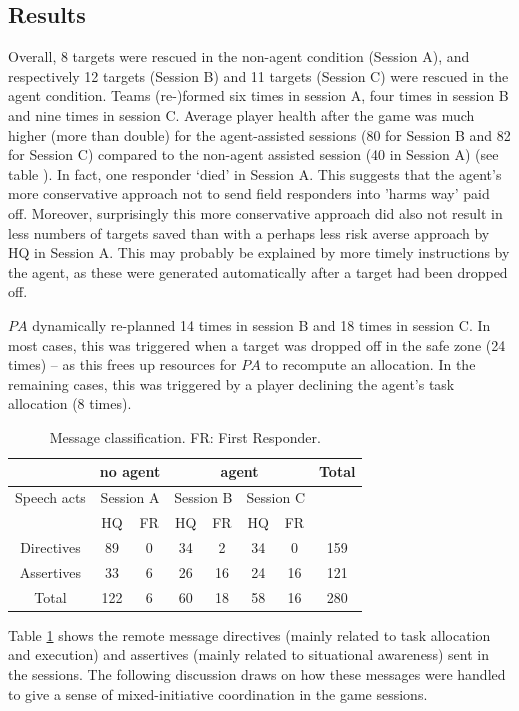 \subsection{Results}
\noindent Overall, 8 targets were rescued in the non-agent condition (Session A), and respectively 12 targets (Session B) and 11 targets (Session C) were rescued in the agent condition. Teams (re-)formed six times in session A, four times in session B and nine times  in session C. Average player health after the game was much higher (more than double) for the agent-assisted sessions (80 for Session B and 82 for Session C) compared to the non-agent assisted session (40 in Session A) (see table ). In fact, one responder `died' in Session A. This suggests that the agent's more conservative approach not to send field responders  into 'harms way' paid off. Moreover, surprisingly this more conservative approach did also not result in less numbers of targets saved than with a perhaps less risk averse approach by HQ in Session A. This may probably be explained by more timely instructions by the agent, as these were generated automatically after a target had been dropped off.  

$PA$ dynamically re-planned 14 times in session B and 18 times in session C. In most cases, this was triggered when a target was dropped off in the safe zone (24 times) -- as this frees up resources for  $PA$ to recompute an allocation. In the remaining cases, this was triggered by a player declining the agent's task allocation (8 times). 



\begin{table}[ht]\small\centering
 \caption{Message classification. FR: First Responder.} \label{tab:msgs}
\begin{tabular}{c | c c | c c c c | c}
 & \multicolumn{2}{c|}{no agent} &  \multicolumn{4}{c|}{agent} & Total \\
 \hline
 Speech acts & \multicolumn{2}{c|}{Session A} & \multicolumn{2}{c}{Session B} & \multicolumn{2}{c|}{Session C} & \\
  & HQ & FR & HQ & FR & HQ & FR & \\
  \hline
  Directives & 89 & 0 & 34 & 2 & 34 & 0 & 159 \\
  Assertives & 33 & 6 & 26 & 16 & 24 & 16 & 121 \\
  \hline
  Total & 122 & 6 & 60 & 18 & 58 & 16 & 280 \\
\end{tabular}
\end{table}
Table \ref{tab:msgs} shows the remote message directives (mainly related to task allocation and execution) and assertives (mainly related to situational awareness) sent in the sessions. The following discussion draws on how these messages were handled to give a sense of mixed-initiative coordination in the game sessions.


